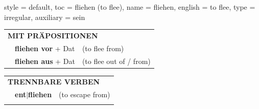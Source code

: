 \begin{verbentry}{
  style = {default},
  toc = {fliehen (to flee)},
  name = {fliehen},
  english = {to flee},
  type = {irregular},
  auxiliary = {sein}
}
   \vspace{10pt}

   \begin{tabular}{lll}
      \multicolumn{3}{l}{\textbf{MIT PRÄPOSITIONEN}}\\
& \textbf{fliehen vor} + Dat & (to flee from)\\
& \textbf{fliehen aus} + Dat & (to flee out of / from)\\
\end{tabular}
  \hfill
   \begin{tabular}{lll}
      \multicolumn{3}{l}{\textbf{TRENNBARE VERBEN}}\\
 & \textbf{ent$|$fliehen} & (to escape from)\\
\vspace{10pt}
  \end{tabular}

  \vspace{-5pt}
\end{verbentry}

